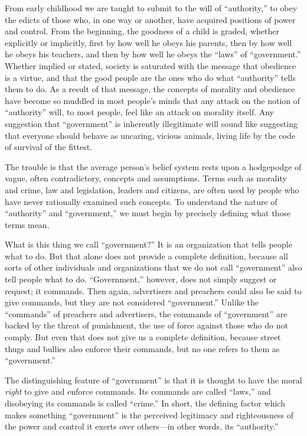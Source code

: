 \documentclass{book}
\begin{document}
From early childhood we are taught to submit to the will of \enquote{authority,} to obey the edicts of those who, in one way or another, have acquired positions of power and control. From the beginning, the goodness of a child is graded, whether explicitly or implicitly, first by how well he obeys his parents, then by how well he obeys his teachers, and then by how well he obeys the \enquote{laws} of \enquote{government.} Whether implied or stated, society is saturated with the message that obedience is a virtue, and that the good people are the ones who do what \enquote{authority} tells them to do. As a result of that message, the concepts of morality and obedience have become so muddled in most people's minds that any attack on the notion of \enquote{authority} will, to most people, feel like an attack on morality itself. Any suggestion that \enquote{government} is inherently illegitimate will sound like suggesting that everyone should behave as uncaring, vicious animals, living life by the code of survival of the fittest.

The trouble is that the average person's belief system rests upon a hodgepodge of vague, often contradictory, concepts and assumptions. Terms such as morality and crime, law and legislation, leaders and citizens, are often used by people who have never rationally examined such concepts. To understand the nature of \enquote{authority} and \enquote{government,} we must begin by precisely defining what those terms mean.

What is this thing we call \enquote{government?} It is an organization that tells people what to do. But that alone does not provide a complete definition, because all sorts of other individuals and organizations that we do not call \enquote{government} also tell people what to do. \enquote{Government,} however, does not simply suggest or request; it commands. Then again, advertisers and preachers could also be said to give commands, but they are not considered \enquote{government.} Unlike the \enquote{commands} of preachers and advertisers, the commands of \enquote{government} are backed by the threat of punishment, the use of force against those who do not comply. But even that does not give us a complete definition, because street thugs and bullies also enforce their commands, but no one refers to them as \enquote{government.}

The distinguishing feature of \enquote{government} is that it is thought to have the moral \emph{right} to give and enforce commands. Its commands are called \enquote{laws,} and disobeying its commands is called \enquote{crime.} In short, the defining factor which makes something \enquote{government} is the perceived legitimacy and righteousness of the power and control it exerts over others---in other words, its \enquote{authority.}
\end{document}
